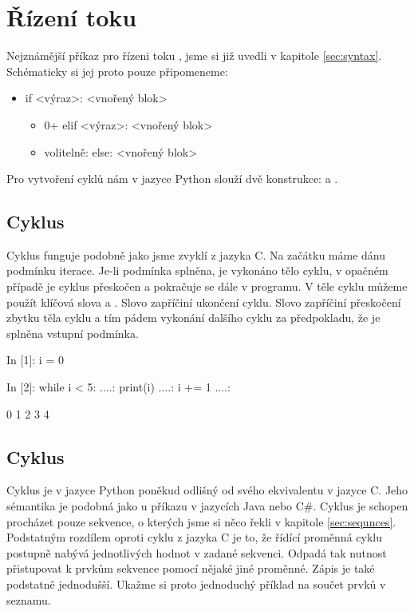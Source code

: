 \section{Řízení toku}

Nejznámější příkaz pro řízeni toku , jsme si již uvedli v kapitole \ref{sec:syntax}.
Schématicky si jej proto pouze připomeneme:

\begin{itemize}
    \item {\color{red}if} <výraz>: <vnořený blok>
    \begin{itemize}
        \item 0+ {\color{red}elif} <výraz>: <vnořený blok>
        \item volitelně: {\color{red}else}: <vnořený blok>
    \end{itemize}
\end{itemize}

Pro vytvoření cyklů nám v jazyce Python slouží dvě konstrukce:  a .

\subsection{Cyklus }

Cyklus  funguje podobně jako jsme zvyklí z jazyka C. Na začátku máme dánu podmínku iterace.
Je-li podmínka splněna, je vykonáno tělo cyklu, v opačném případě je cyklus přeskočen a pokračuje se dále
v programu. V těle cyklu můžeme použít klíčová slova  a . Slovo 
zapříčiní ukončení cyklu. Slovo  zapříčiní přeskočení zbytku těla cyklu a tím pádem
vykonání dalšího cyklu za předpokladu, že je splněna vstupní podmínka.


\begin{python}
In [1]: i = 0

In [2]: while i < 5:
   ....:     print(i)
   ....:     i += 1
   ....:     

0
1
2
3
4
\end{python}

\subsection{Cyklus } 

Cyklus  je v jazyce Python poněkud odlišný od svého ekvivalentu v jazyce C. Jeho sémantika je podobná jako
u příkazu  v jazycích Java nebo C\#. Cyklus  je schopen procházet pouze sekvence, o kterých
jsme si něco řekli v kapitole \ref{sec:sequnces}. Podstatným rozdílem oproti cyklu  z jazyka C je to, že
řídící proměnná cyklu postupně nabývá jednotlivých hodnot v zadané sekvenci. Odpadá tak nutnost přistupovat k prvkům
sekvence pomocí nějaké jiné proměnné. Zápis je také podstatně jednodušší. Ukažme si proto jednoduchý příklad na součet
prvků v seznamu.

